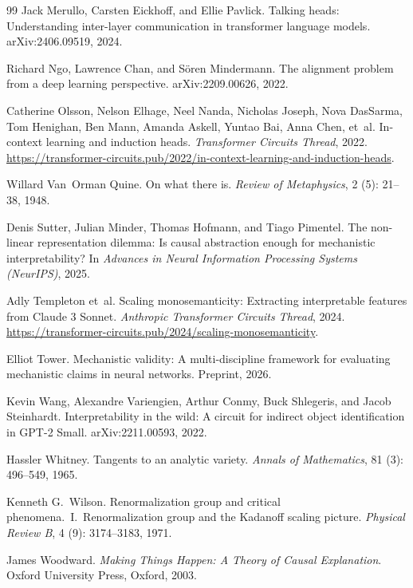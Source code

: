 \documentclass[11pt]{article}
\theoremstyle{remark}
\begin{document}
\begin{thebibliography}{99}
Jack Merullo, Carsten Eickhoff, and Ellie Pavlick.
\newblock Talking heads: Understanding inter-layer communication in transformer
  language models.
\newblock arXiv:2406.09519, 2024.

Richard Ngo, Lawrence Chan, and S\"oren Mindermann.
\newblock The alignment problem from a deep learning perspective.
\newblock arXiv:2209.00626, 2022.

Catherine Olsson, Nelson Elhage, Neel Nanda, Nicholas Joseph, Nova DasSarma,
  Tom Henighan, Ben Mann, Amanda Askell, Yuntao Bai, Anna Chen, et~al.
\newblock In-context learning and induction heads.
\newblock \emph{Transformer Circuits Thread}, 2022.
\newblock \url{https://transformer-circuits.pub/2022/in-context-learning-and-induction-heads}.

Willard Van~Orman Quine.
\newblock On what there is.
\newblock \emph{Review of Metaphysics}, 2 (5): 21--38, 1948.

Denis Sutter, Julian Minder, Thomas Hofmann, and Tiago Pimentel.
\newblock The non-linear representation dilemma: Is causal abstraction enough
  for mechanistic interpretability?
\newblock In \emph{Advances in Neural Information Processing Systems
  (NeurIPS)}, 2025.

Adly Templeton et~al.
\newblock Scaling monosemanticity: Extracting interpretable features from
  {Claude 3 Sonnet}.
\newblock \emph{Anthropic Transformer Circuits Thread}, 2024.
\newblock \url{https://transformer-circuits.pub/2024/scaling-monosemanticity}.

Elliot Tower.
\newblock Mechanistic validity: A multi-discipline framework for evaluating
  mechanistic claims in neural networks.
\newblock Preprint, 2026.

Kevin Wang, Alexandre Variengien, Arthur Conmy, Buck Shlegeris, and Jacob
  Steinhardt.
\newblock Interpretability in the wild: A circuit for indirect object
  identification in {GPT-2 Small}.
\newblock arXiv:2211.00593, 2022.

Hassler Whitney.
\newblock Tangents to an analytic variety.
\newblock \emph{Annals of Mathematics}, 81 (3): 496--549, 1965.

Kenneth G.\ Wilson.
\newblock Renormalization group and critical phenomena.\ {I}.\ Renormalization
  group and the {Kadanoff} scaling picture.
\newblock \emph{Physical Review B}, 4 (9): 3174--3183, 1971.

James Woodward.
\newblock \emph{Making Things Happen: A Theory of Causal Explanation}.
\newblock Oxford University Press, Oxford, 2003.

\end{thebibliography}
\end{document}
